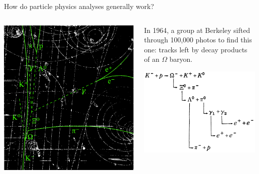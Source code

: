 \documentclass[aspectratio=169]{beamer}
\begin{document}
\begin{frame}{How do particle physics analyses generally work?}
\large
\begin{columns}
\vspace{0.3 cm}
\includegraphics[width=\linewidth]{img/omega-minus-2.png}

\begin{center}
In 1964, a group at Berkeley sifted through 100,000 photos to find this one: tracks left by decay products of an $\Omega$ baryon.

\vspace{0.25 cm}
\includegraphics[width=\linewidth]{img/decay-chain.png}
\end{center}

\end{columns}
\end{frame}
\end{document}
